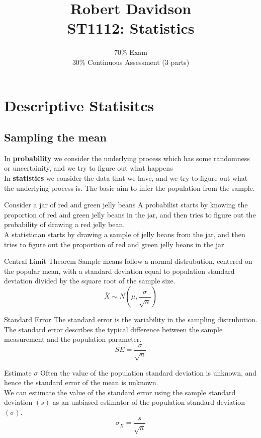 \documentclass[a4paper, 10pt]{article}
\title{
Robert Davidson \\
\textbf{ST1112: Statistics}
}
\author{
70\% Exam\\
30\% Continuous Assessment (3 parts)
}
\date{}       %
\begin{document}
\maketitle
\pagebreak



\tableofcontents
\pagebreak
\section{Descriptive Statisitcs}
\subsection{Sampling the mean}
In \textbf{probability} we consider the underlying process which has some randomness or uncertainity, and we try to figure out what happens \\[2ex]
In \textbf{statistics} we consider the data that we have, and we try to figure out what the underlying process is. The basic aim to infer the population from the sample.
\begin{examplebox}{Consider a jar of red and green jelly beans}{}
    A probabilist starts by knowing the proportion of red and green jelly beans in the jar, and then tries to figure out the probability of drawing a red jelly bean.\\
    A statistician starts by drawing a sample of jelly beans from the jar, and then tries to figure out the proportion of red and green jelly beans in the jar.
\end{examplebox}

\begin{definitionbox}{Central Limit Theorem}{}
    Sample means follow a normal distrubution, centered on the popular mean, with a standard deviation equal to population standard deviation divided by the square root of the sample size.
    $$\bar{X} \sim N \left(\mu, \frac{\sigma}{\sqrt{n}}\right)$$
\end{definitionbox}

\begin{definitionbox}{Standard Error}{}
    The standard error is the variability in the sampling distrubution. \\
    The standard error describes the typical difference between the sample measurement and the population parameter.
    $$SE = \frac{\sigma}{\sqrt{n}}$$
\end{definitionbox}
\begin{definitionbox}{Estimate $\sigma$}{}
    Often the value of the population standard deviation is unknown, and hence the standard error of the mean is unknown. \\
    We can estimate the value of the standard error using the sample standard deviation $(s)$ as an unbiased estimator of the population standard deviation $(\sigma)$.
    $$\sigma_{\bar{X}} = \frac{s}{\sqrt{n}}$$
\end{definitionbox}
\end{document}
